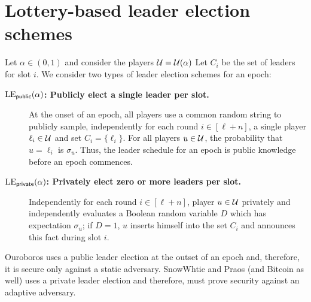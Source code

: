 \section{Lottery-based leader election schemes}\label{sec:leader-election-public-private}
Let $\alpha \in (0,1)$ and consider the players $\mathcal{U} = \mathcal{U}(\alpha)$
Let $C_i$ be the set of leaders for slot $i$. 
We consider two types of leader election schemes for an epoch: 
\begin{description}
    \item[\textbf{$\mathrm{LE}_\mathsf{public}(\alpha)$: Publicly elect a single leader per slot.}] \label{lottery:public}
    At the onset of an epoch, 
    all players use a common random string to 
    publicly sample, 
    independently for each round $i \in [\ell + n]$, 
    a single player $\ell_i \in \mathcal{U}$ and  
    set $C_i = \{\ell_i\}$. 
    For all players $u \in \mathcal{U}$, 
    the probability that $u = \ell_i$ is $\sigma_u$. 
    Thus, the leader schedule for an epoch 
    is public knowledge before an epoch commences. 

    \item[\textbf{$\mathrm{LE}_\mathsf{private}(\alpha)$: Privately elect zero or more leaders per slot.}] \label{lottery:private}
    Independently for each round $i \in [\ell + n]$, 
    player $u \in \mathcal{U}$ 
    privately and independently 
    evaluates a Boolean random variable $D$
    which has expectation $\sigma_u$; 
    if $D = 1$, $u$ 
    inserts himself into the set $C_i$ 
    and announces this fact during slot $i$. 
\end{description}
\noindent
Ouroboros uses a public leader election 
at the outset of an epoch 
and, therefore, it is secure only against a static adversary. 
SnowWhtie and Praos (and Bitcoin as well) uses a private leader election 
and therefore, must prove security against an adaptive adversary. 

